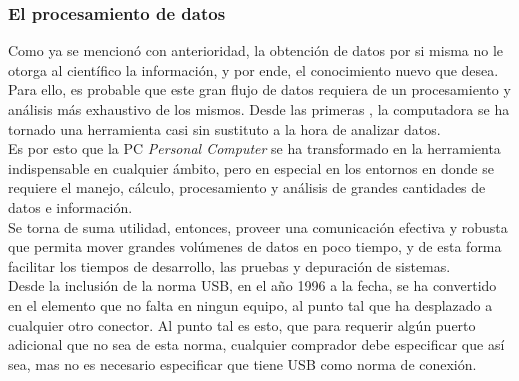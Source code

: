 
\subsubsection*{El procesamiento de datos}

Como ya se mencionó con anterioridad, la obtención de datos por si misma no le otorga al científico la información, y por ende, el conocimiento nuevo que desea. Para ello, es probable que este gran flujo de datos requiera de un procesamiento y análisis más exhaustivo de los mismos. Desde las primeras , la computadora se ha tornado una herramienta casi sin sustituto a la hora de analizar datos.\\


Es por esto que la PC {\it Personal Computer} se ha transformado en la herramienta indispensable en cualquier ámbito, pero en especial en los entornos en donde se requiere el  manejo, cálculo, procesamiento y análisis de grandes cantidades de datos e información.\\

Se torna de suma utilidad, entonces, proveer una comunicación efectiva y robusta que permita mover grandes volúmenes de datos en poco tiempo, y de esta forma facilitar los tiempos de desarrollo, las pruebas y depuración de sistemas.\\

Desde la inclusión de la norma USB, en el año 1996 a la fecha, se ha convertido en el elemento que no falta en ningun equipo, al punto tal que ha desplazado a cualquier otro conector. Al punto tal es esto, que para requerir algún puerto adicional que no sea de esta norma, cualquier comprador debe especificar que así sea, mas no es necesario especificar que tiene USB como norma de conexión.\\

